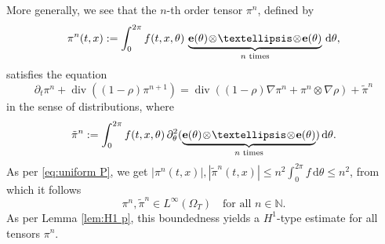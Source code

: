 \documentclass[11pt,a4paper,reqno]{amsart}
\theoremstyle{remark}
\theoremstyle{definition}
\numberwithin{equation}{section}
\DeclareMathOperator{\dv}{div}
\newcommand{\e}{{\bf e}}
\renewcommand{\d}{\, \mathrm{d} }
\begin{document}
More generally, we see that the $n$-th order tensor $\pi^n$, defined by 
\begin{equation}\label{eq:tensor def}
    \pi^n(t,x) := \int_0^{2\pi} f(t,x,\theta) \, \underbrace{\e(\theta)\!\otimes\!\dots \! \otimes \!\e(\theta)}_{n \text{ times}} \d \theta,
\end{equation}
satisfies the equation 
\begin{equation}\label{eq:tensor order n eq}
    \partial_t \pi^n + \dv((1-\rho)\pi^{n+1}) = \dv((1-\rho)\nabla \pi^n + \pi^n \otimes \nabla \rho) + \tilde{\pi}^n 
\end{equation}
in the sense of distributions, where 
\begin{equation*}
    \tilde{\pi}^n := \int_0^{2\pi} f(t,x,\theta) \, \partial^2_\theta (\underbrace{\e(\theta)\!\otimes\!\dots \! \otimes \!\e(\theta)}_{n \text{ times}}) \d \theta. 
\end{equation*}
As per \eqref{eq:uniform P}, we get $|\pi^n(t,x)|, |\tilde{\pi}^n(t,x)| \leq n^2 \int_0^{2\pi} f \d \theta \leq n^2$, from which it follows 
\begin{equation}\label{eq:tensor unif bded}
    \pi^n , \tilde{\pi}^n \in L^\infty(\Omega_T) \quad \text{for all } n \in \mathbb{N}. 
\end{equation}
As per Lemma \ref{lem:H1 p}, this boundedness yields a $H^1$-type estimate for all tensors $\pi^n$. 
\end{document}
